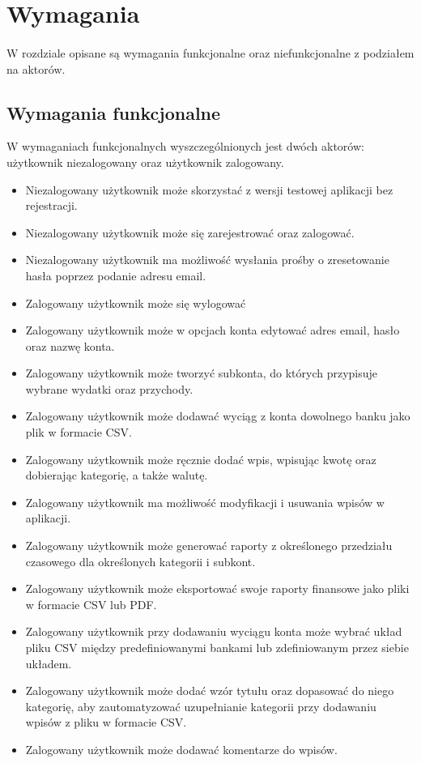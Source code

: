 \documentclass{article}
\begin{document}
	\section{Wymagania}
	\paragraph{} W rozdziale opisane są wymagania funkcjonalne oraz niefunkcjonalne z podziałem na aktorów.
	\subsection{Wymagania funkcjonalne}
	W wymaganiach funkcjonalnych wyszczególnionych jest dwóch aktorów: użytkownik niezalogowany oraz użytkownik zalogowany.
	\begin{itemize}
		\item Niezalogowany użytkownik może skorzystać z wersji testowej aplikacji bez rejestracji.
		\item Niezalogowany użytkownik może się zarejestrować oraz zalogować.
		\item Niezalogowany użytkownik ma możliwość wysłania prośby o zresetowanie hasła poprzez podanie adresu email.
		\item Zalogowany użytkownik może się wylogować
		\item Zalogowany użytkownik może w opcjach konta edytować adres email, hasło oraz nazwę konta.
		\item Zalogowany użytkownik może tworzyć subkonta, do których przypisuje wybrane wydatki oraz przychody.
		\item Zalogowany użytkownik może dodawać wyciąg z konta dowolnego banku jako plik w formacie CSV.
		\item Zalogowany użytkownik może ręcznie dodać wpis, wpisując kwotę oraz dobierając kategorię, a także walutę.
		\item Zalogowany użytkownik ma możliwość modyfikacji i usuwania wpisów w aplikacji.
		\item Zalogowany użytkownik może generować raporty z określonego przedziału czasowego dla określonych kategorii i subkont.
		\item Zalogowany użytkownik może eksportować swoje raporty finansowe jako pliki w formacie CSV lub PDF.
		\item Zalogowany użytkownik przy dodawaniu wyciągu konta może wybrać układ pliku CSV między predefiniowanymi bankami lub zdefiniowanym przez siebie układem.
		\item Zalogowany użytkownik może dodać wzór tytułu oraz dopasować do niego kategorię, aby zautomatyzować uzupełnianie kategorii przy dodawaniu wpisów z pliku w formacie CSV.
		\item Zalogowany użytkownik może dodawać komentarze do wpisów.
		
	\end{itemize}
\end{document}

